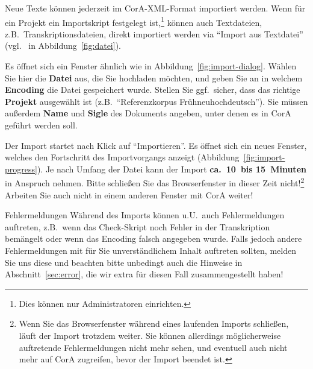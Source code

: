 \documentclass[11pt,a4paper,parskip=half]{scrartcl}
\begin{document}
Neue Texte können jederzeit im CorA-XML-Format importiert werden.  Wenn für ein
Projekt ein Importskript festgelegt ist,\footnote{Dies können nur
  Administratoren einrichten.} können auch Textdateien, z.B.\
Transkriptionsdateien, direkt importiert werden via ``Import aus Textdatei''
(vgl.\ \circled{3} in Abbildung~\ref{fig:datei}).

Es öffnet sich ein Fenster ähnlich wie in
Abbildung~\ref{fig:import-dialog}.  Wählen Sie hier die \textbf{Datei}
aus, die Sie hochladen möchten, und geben Sie an in welchem
\textbf{Encoding} die Datei gespeichert wurde.  Stellen Sie ggf.\
sicher, dass das richtige \textbf{Projekt} ausgewählt ist (z.B.\
"`Referenzkorpus Frühneuhochdeutsch"').  Sie müssen außerdem
\textbf{Name} und \textbf{Sigle} des Dokuments angeben, unter denen es
in CorA geführt werden soll.

Der Import startet nach Klick auf "`Importieren"'.  Es öffnet sich ein
neues Fenster, welches den Fortschritt des Importvorgangs anzeigt
(Abbildung~\ref{fig:import-progress}).  Je nach Umfang der Datei kann
der Import \textbf{ca.\ 10~bis 15~Minuten} in Anspruch nehmen.  Bitte
schließen Sie das Browserfenster in dieser Zeit nicht!\footnote{Wenn
  Sie das Browserfenster während eines laufenden Imports schließen,
  läuft der Import trotzdem weiter.  Sie können allerdings
  möglicherweise auftretende Fehlermeldungen nicht mehr sehen, und
  eventuell auch nicht mehr auf CorA zugreifen, bevor der Import
  beendet ist.}  Arbeiten Sie auch nicht in einem anderen Fenster mit
CorA weiter!

\begin{infobox}{Fehlermeldungen}
  Während des Imports können u.U.\ auch Fehlermeldungen auftreten,
  z.B.\ wenn das Check-Skript noch Fehler in der Transkription
  bemängelt oder wenn das Encoding falsch angegeben wurde.  Falls
  jedoch andere Fehlermeldungen mit für Sie unverständlichem Inhalt
  auftreten sollten, melden Sie uns diese und beachten bitte unbedingt
  auch die Hinweise in Abschnitt~\ref{sec:error}, die wir extra für
  diesen Fall zusammengestellt haben!
\end{infobox}

\end{document}
